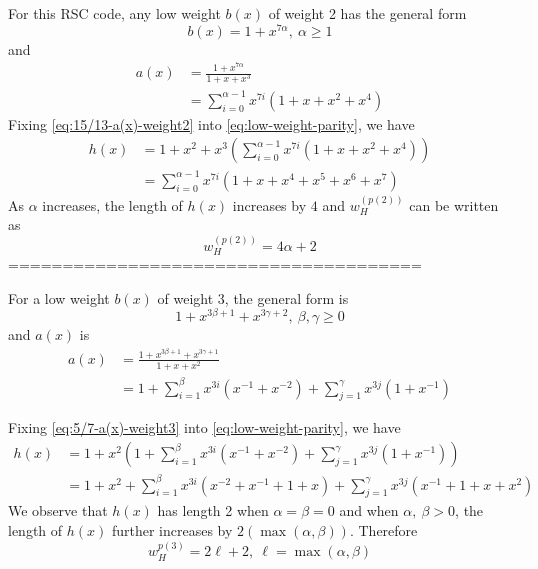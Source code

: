 \documentclass[11pt, oneside, dvipdfmx]{book}
\begin{document}
\begin{example}[15/13 RSC code, $f(x)=1+x^2+x^3,~g(x)=1+x+x^3$]
For this RSC code, any low weight $b(x)$ of weight 2 has the general form 
\begin{equation}
b(x)=1+x^{7\alpha},~\alpha \geq 1
\label{eq:15/13-weight-2}
\end{equation}
and 
\begin{equation}
\begin{split}
a(x)&=\frac{1+x^{7\alpha}}{1+x+x^3}\\
&=\sum_{i=0}^{\alpha-1}x^{7i}\left(1+x+x^2+x^4\right)
\end{split}
\label{eq:15/13-a(x)-weight2}
\end{equation}
Fixing \eqref{eq:15/13-a(x)-weight2} into \eqref{eq:low-weight-parity}, we have 
\begin{equation}
\begin{split}
h(x)&=1+x^2+x^3\left(\sum_{i=0}^{\alpha-1}x^{7i}\left(1+x+x^2+x^4\right)\right)\\
&=\sum_{i=0}^{\alpha-1}x^{7i}\left(1+x+x^4+x^5+x^6+x^7\right)
\end{split}
\label{eq:15/13-h(x)-weight2}
\end{equation}
As $\alpha$ increases, the length of $h(x)$ increases by $4$ and $w_H^{(p(2))}$ can be written as $$w_H^{(p(2))}=4\alpha+2$$
======================================

For a low weight $b(x)$ of weight 3, the general form is 
\begin{equation}
1+x^{3\beta +1}+x^{3\gamma+2},~\beta,\gamma \geq 0
\label{eq:5/7-weight-3}
\end{equation}
and $a(x)$ is 
\begin{equation}
\begin{split}
a(x)&=\frac{1+x^{3\beta +1}+x^{3\gamma+1}}{1+x+x^2}\\
&=1+\sum_{i=1}^{\beta}x^{3i}\left(x^{-1}+x^{-2}\right) + \sum_{j=1}^{\gamma}x^{3j}\left(1+x^{-1}\right)
\end{split}
\label{eq:5/7-a(x)-weight3}
\end{equation}

Fixing \eqref{eq:5/7-a(x)-weight3} into \eqref{eq:low-weight-parity}, we have 
\begin{equation}
\begin{split}
h(x)&=1+x^2\left(1+\sum_{i=1}^{\beta}x^{3i}\left(x^{-1}+x^{-2}\right) + \sum_{j=1}^{\gamma}x^{3j}\left(1+x^{-1}\right)\right)\\
&=1+x^2+\sum_{i=1}^{\beta}x^{3i}\left(x^{-2}+x^{-1}+1+x\right) + \sum_{j=1}^{\gamma}x^{3j}\left(x^{-1}+1+x+x^2\right)
\end{split}
\label{eq:5/7-h(x)-weight-3}
\end{equation}
We observe that $h(x)$ has length 2 when $\alpha =\beta =0$ and when $\alpha,~\beta>0$, the length of $h(x)$ further increases by $2(\max(\alpha,\beta))$. Therefore
$$w_H^{p(3)}=2\ell+2,~\ell=\max(\alpha,\beta)$$

\end{example}
\end{document}
